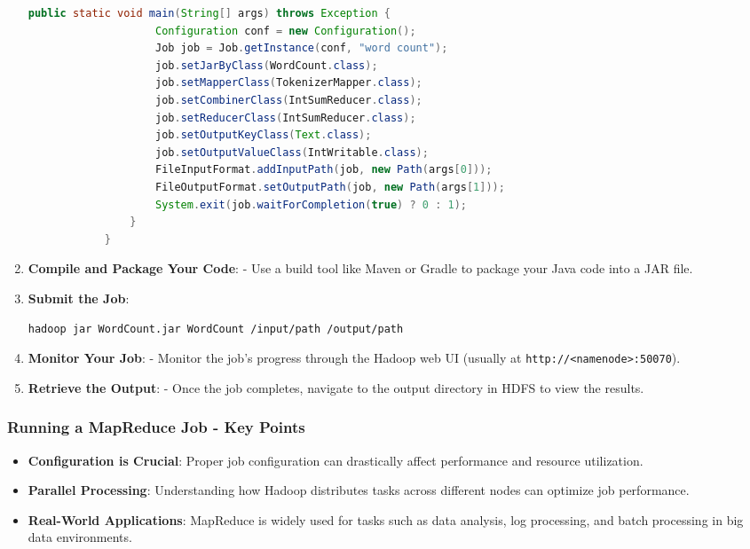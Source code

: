 \documentclass[aspectratio=169]{beamer}
\begin{document}
\begin{frame}[fragile]
\begin{enumerate}
\begin{lstlisting}[language=Java]
                public static void main(String[] args) throws Exception {
                    Configuration conf = new Configuration();
                    Job job = Job.getInstance(conf, "word count");
                    job.setJarByClass(WordCount.class);
                    job.setMapperClass(TokenizerMapper.class);
                    job.setCombinerClass(IntSumReducer.class);
                    job.setReducerClass(IntSumReducer.class);
                    job.setOutputKeyClass(Text.class);
                    job.setOutputValueClass(IntWritable.class);
                    FileInputFormat.addInputPath(job, new Path(args[0]));
                    FileOutputFormat.setOutputPath(job, new Path(args[1]));
                    System.exit(job.waitForCompletion(true) ? 0 : 1);
                }
            }
            \end{lstlisting}
        \item \textbf{Compile and Package Your Code}:
            - Use a build tool like Maven or Gradle to package your Java code into a JAR file.
        \item \textbf{Submit the Job}:
            \begin{lstlisting}[language=bash]
            hadoop jar WordCount.jar WordCount /input/path /output/path
            \end{lstlisting}
        \item \textbf{Monitor Your Job}:
            - Monitor the job's progress through the Hadoop web UI (usually at \texttt{http://<namenode>:50070}).
        \item \textbf{Retrieve the Output}:
            - Once the job completes, navigate to the output directory in HDFS to view the results.
    \end{enumerate}
\end{frame}

\begin{frame}[fragile]
    \frametitle{Running a MapReduce Job - Key Points}
    \begin{itemize}
        \item \textbf{Configuration is Crucial}: Proper job configuration can drastically affect performance and resource utilization.
        \item \textbf{Parallel Processing}: Understanding how Hadoop distributes tasks across different nodes can optimize job performance.
        \item \textbf{Real-World Applications}: MapReduce is widely used for tasks such as data analysis, log processing, and batch processing in big data environments.
    \end{itemize}
\end{frame}
\end{document}
